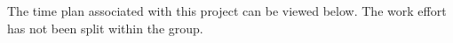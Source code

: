 The time plan associated with this project can be viewed below. The work effort has not been split within the group.